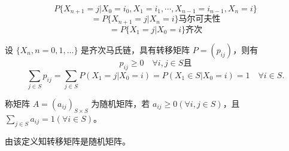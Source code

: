 \documentclass[lang=cn,10pt,thmcnt=section]{elegantbook}
\begin{document}
\[ P\{X_{n+1} = j | X_0 = i_0, X_1 = i_1, \cdots, X_{n-1} = i_{n-1}, X_n = i\} \]
\[ = P\{X_{n+1} = j | X_n = i\} \text{马尔可夫性} \]
\[ = P\{X_1 = j | X_0 = i\} \text{齐次} \]

设 $\{X_n, n = 0, 1, \ldots\}$ 是齐次马氏链，具有转移矩阵 $P = (p_{ij})$，则有
\[ p_{ij} \geq 0 \quad \forall i, j \in S \text{且} \]
\[ \sum_{j \in S} p_{ij} = \sum_{j \in S} P(X_1 = j | X_0 = i) = P(X_1 \in S | X_0 = i) = 1 \quad \forall i \in S. \]

\begin{definition}[随机矩阵]
	称矩阵 $A = (a_{ij})_{S \times S}$ 为随机矩阵，若 $a_{ij} \geq 0 (\forall i, j \in S)$，且 $\sum_{j \in S} a_{ij} = 1 (\forall i \in S)$。
\end{definition}

由该定义知转移矩阵是随机矩阵。
\end{document}
